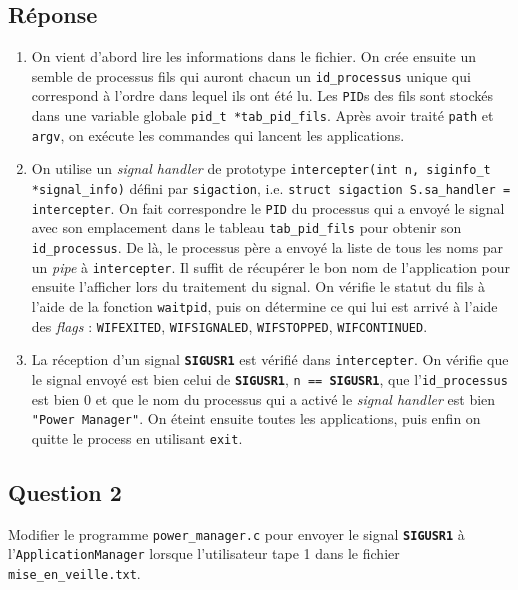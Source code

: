 \documentclass[
	12pt, %
]{fphw}
\begin{document}
\subsection*{Réponse}
\begin{enumerate}
\item On vient d'abord lire les informations dans le fichier. On crée ensuite un semble de processus fils qui auront chacun un \texttt{id\_processus} unique qui correspond à l'ordre dans lequel ils ont été lu. Les \texttt{PID}s des fils sont stockés dans une variable globale \texttt{pid\_t *tab\_pid\_fils}. Après avoir traité \texttt{path} et \texttt{argv}, on exécute les commandes qui lancent les applications.
	\item On utilise un \textit{signal handler} de prototype \texttt{intercepter(int n, siginfo\_t *signal\_info)} défini par \texttt{sigaction}, i.e. \texttt{struct sigaction S.sa\_handler = intercepter}. On fait correspondre le \texttt{PID} du processus qui a envoyé le signal avec son emplacement dans le tableau \texttt{tab\_pid\_fils} pour obtenir son \texttt{id\_processus}. De là, le processus père a envoyé la liste de tous les noms par un \textit{pipe} à \texttt{intercepter}. Il suffit de récupérer le bon nom de l'application pour ensuite l'afficher lors du traitement du signal. On vérifie le statut du fils à l'aide de la fonction \texttt{waitpid}, puis on détermine ce qui lui est arrivé à l'aide des \textit{flags} : \texttt{WIFEXITED}, \texttt{WIFSIGNALED}, \texttt{WIFSTOPPED}, \texttt{WIFCONTINUED}. 
	\item La réception d'un signal \texttt{\textbf{SIGUSR1}} est vérifié dans \texttt{intercepter}. On vérifie que le signal envoyé est bien celui de \texttt{\textbf{SIGUSR1}}, \texttt{n == \textbf{SIGUSR1}}, que l'\texttt{id\_processus} est bien 0 et que le nom du processus qui a activé le \textit{signal handler} est bien \texttt{"Power Manager"}. On éteint ensuite toutes les applications, puis enfin on quitte le process en utilisant \texttt{exit}. 	
\end{enumerate}

	
%


\subsection*{Question 2}
Modifier le programme \texttt{power\_manager.c} pour envoyer le signal \texttt{\textbf{SIGUSR1}} à l'\texttt{ApplicationManager} lorsque l'utilisateur tape 1 dans le fichier \texttt{mise\_en\_veille.txt}.
\end{document}
